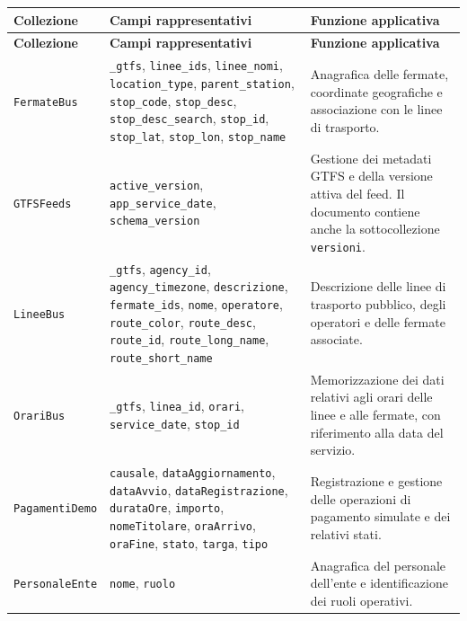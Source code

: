 \begin{longtable}{P{3cm}P{6.1cm}P{5.5cm}}
\label{tab:collezioni}\\
\toprule
\textbf{Collezione} &
\textbf{Campi rappresentativi} &
\textbf{Funzione applicativa}\\
\midrule
\endfirsthead

\toprule
\textbf{Collezione} &
\textbf{Campi rappresentativi} &
\textbf{Funzione applicativa}\\
\midrule
\endhead
\endfoot
\texttt{FermateBus} &
\texttt{\_gtfs}, \texttt{linee\_ids},
\texttt{linee\_nomi}, \texttt{location\_type},
\texttt{parent\_station}, \texttt{stop\_code},
\texttt{stop\_desc}, \texttt{stop\_desc\_search},
\texttt{stop\_id}, \texttt{stop\_lat},
\texttt{stop\_lon}, \texttt{stop\_name} &
Anagrafica delle fermate, coordinate geografiche
e associazione con le linee di trasporto.\\

\texttt{GTFSFeeds} &
\texttt{active\_version},
\texttt{app\_service\_date},
\texttt{schema\_version} &
Gestione dei metadati GTFS e della versione
attiva del feed. Il documento contiene anche
la sottocollezione \texttt{versioni}.\\

\texttt{LineeBus} &
\texttt{\_gtfs}, \texttt{agency\_id},
\texttt{agency\_timezone}, \texttt{descrizione},
\texttt{fermate\_ids}, \texttt{nome},
\texttt{operatore}, \texttt{route\_color},
\texttt{route\_desc}, \texttt{route\_id},
\texttt{route\_long\_name},
\texttt{route\_short\_name} &
Descrizione delle linee di trasporto pubblico,
degli operatori e delle fermate associate.\\

\texttt{OrariBus} &
\texttt{\_gtfs}, \texttt{linea\_id},
\texttt{orari}, \texttt{service\_date},
\texttt{stop\_id} &
Memorizzazione dei dati relativi agli orari
delle linee e alle fermate, con riferimento
alla data del servizio.\\

\texttt{PagamentiDemo} &
\texttt{causale}, \texttt{dataAggiornamento},
\texttt{dataAvvio}, \texttt{dataRegistrazione},
\texttt{durataOre}, \texttt{importo},
\texttt{nomeTitolare}, \texttt{oraArrivo},
\texttt{oraFine}, \texttt{stato},
\texttt{targa}, \texttt{tipo} &
Registrazione e gestione delle operazioni
di pagamento simulate e dei relativi stati.\\

\texttt{PersonaleEnte} &
\texttt{nome}, \texttt{ruolo} &
Anagrafica del personale dell'ente
e identificazione dei ruoli operativi.\\


\end{longtable}
